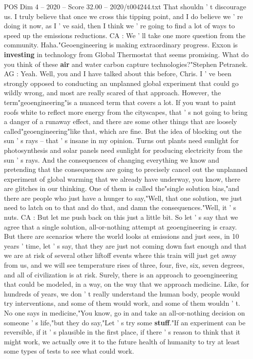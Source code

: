\begin{textsample}{POS Dim 4 – 2020 – Score 32.00 – 2020/t004244.txt}
That shouldn ' t discourage us.
I truly believe that once we cross this tipping point, and I do believe we ' re doing it now, as I ' ve said, then I think we ' re going to find a lot of ways to speed up the emissions reductions.
CA : We ' ll take one more question from the community.
Haha."Geoengineering is making extraordinary progress.
Exxon is \textbf{investing} in technology from Global Thermostat that seems promising.
What do you think of these \textbf{air} and water carbon capture technologies?"Stephen Petranek.
AG : Yeah.
Well, you and I have talked about this before, Chris.
I ' ve been strongly opposed to conducting an unplanned global experiment that could go wildly wrong, and most are really scared of that approach.
However, the term"geoengineering"is a nuanced term that covers a lot.
If you want to paint roofs white to reflect more energy from the cityscapes, that ' s not going to bring a danger of a runaway effect, and there are some other things that are loosely called"geoengineering"like that, which are fine.
But the idea of blocking out the sun ' s rays -- that ' s insane in my opinion.
Turns out plants need sunlight for photosynthesis and solar panels need sunlight for producing electricity from the sun ' s rays.
And the consequences of changing everything we know and pretending that the consequences are going to precisely cancel out the unplanned experiment of global warming that we already have underway, you know, there are glitches in our thinking.
One of them is called the"single solution bias,"and there are people who just have a hunger to say,"Well, that one solution, we just need to latch on to that and do that, and damn the consequences."Well, it ' s nuts.
CA : But let me push back on this just a little bit.
So let ' s say that we agree that a single solution, all-or-nothing attempt at geoengineering is crazy.
But there are scenarios where the world looks at emissions and just sees, in 10 years ' time, let ' s say, that they are just not coming down fast enough and that we are at risk of several other liftoff events where this train will just get away from us, and we will see temperature rises of three, four, five, six, seven degrees, and all of civilization is at risk.
Surely, there is an approach to geoengineering that could be modeled, in a way, on the way that we approach medicine.
Like, for hundreds of years, we don ' t really understand the human body, people would try interventions, and some of them would work, and some of them wouldn ' t.
No one says in medicine,"You know, go in and take an all-or-nothing decision on someone ' s life,"but they do say,"Let ' s try some \textbf{stuff}."If an experiment can be reversible, if it ' s plausible in the first place, if there ' s reason to think that it might work, we actually owe it to the future health of humanity to try at least some types of tests to see what could work.

\end{textsample}
